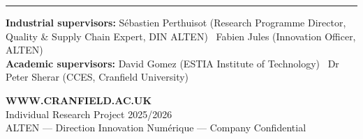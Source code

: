 \documentclass[20pt]{extarticle}
\begin{document}
\begin{minipage}[t][\textheight][t]{\textwidth}
\begin{minipage}[t]{0.489\linewidth}
\end{minipage}

\vfill
{\color{altenazure}\rule{\linewidth}{2pt}}
\vspace{2.5mm}

{\fontsize{18}{22}\selectfont
\begin{minipage}[t]{0.66\linewidth}
\textbf{Industrial supervisors:} Sébastien Perthuisot (Research Programme
Director, Quality \& Supply Chain Expert, DIN ALTEN) \textbullet\ Fabien Jules
(Innovation Officer, ALTEN)\\[1.5mm]
\textbf{Academic supervisors:} David Gomez (ESTIA Institute of Technology)
\textbullet\ Dr Peter Sherar (CCES, Cranfield University)
\end{minipage}\hfill
\begin{minipage}[t]{0.31\linewidth}
\raggedleft
\textbf{\textcolor{altennavy}{WWW.CRANFIELD.AC.UK}}\\[1.5mm]
Individual Research Project 2025/2026\\[1.5mm]
\textcolor{captiongrey}{ALTEN — Direction Innovation Numérique — Company Confidential}
\end{minipage}}
\end{minipage}
\end{document}
